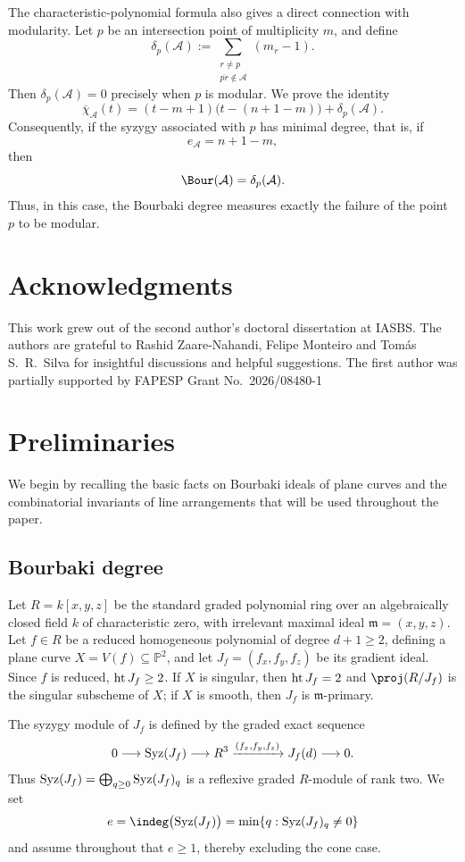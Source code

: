 \documentclass[11pt]{amsart}   %
\theoremstyle{definition}
\def\hht{{\rm ht}\,}
\def\syz{\mbox{\rm Syz}}
\def\hht{{\rm ht}\,}
\def\fm{{\mathfrak m}}
\def\fm{{\mathfrak m}}
\def\NZQ{\mathbb}               %
\def\PP{{\NZQ P}}
\def\A{{\mathcal A}}
\begin{document}
The characteristic-polynomial formula also gives a direct connection
with modularity. Let $p$ be an intersection point of multiplicity
$m$, and define
\[
\delta_p(\A)
:=
\sum_{\substack{r\neq p\\ \overline{pr}\notin\A}}
(m_r-1).
\]
Then $\delta_p(\A)=0$ precisely when $p$ is modular. We prove the
identity
\[
\overline{\chi}_\A(t)
=
(t-m+1)\bigl(t-(n+1-m)\bigr)+\delta_p(\A).
\]
Consequently, if the syzygy associated with $p$ has minimal degree,
that is, if
\[
e_\A=n+1-m,
\]
then
\[
\Bour(\A)=\delta_p(\A).
\]
Thus, in this case, the Bourbaki degree measures exactly the failure
of the point $p$ to be modular.



\section*{Acknowledgments}
This work grew out of the second author's doctoral dissertation at IASBS. The authors are grateful to  Rashid Zaare-Nahandi, Felipe Monteiro and  Tomás S.~R.~Silva for insightful discussions and helpful suggestions. The first author was partially supported by FAPESP Grant No.~2026/08480-1


\section{Preliminaries}
\label{sec:preliminaries}
We begin by recalling the basic facts on Bourbaki ideals of plane curves and the combinatorial invariants of line arrangements that will be used throughout the paper.

\subsection{Bourbaki degree}
Let $R=k[x,y,z]$ be the standard graded polynomial ring over an algebraically closed field $k$ of characteristic zero, with irrelevant maximal ideal $\fm=(x,y,z)$. Let $f\in R$ be a reduced homogeneous polynomial of degree $d+1\geq2$, defining a plane curve $X=V(f)\subseteq\PP^2$, and let $J_f=(f_x,f_y,f_z)$ be its gradient ideal. Since $f$ is reduced, $\hht J_f\geq2$. If $X$ is singular, then $\hht J_f=2$ and $\proj(R/J_f)$ is the singular subscheme of $X$; if $X$ is smooth, then $J_f$ is $\fm$-primary.

The syzygy module of $J_f$ is defined by the graded exact sequence
\[
0\longrightarrow\syz(J_f)\longrightarrow R^3
\xrightarrow{(f_x,f_y,f_z)}J_f(d)\longrightarrow0.
\]
Thus $\syz(J_f)=\bigoplus_{q\geq0}\syz(J_f)_q$ is a reflexive graded $R$-module of rank two. We set
\[
e=\indeg\bigl(\syz(J_f)\bigr)
=\min\{q:\syz(J_f)_q\neq0\}
\]
and assume throughout that $e\geq1$, thereby excluding the cone case.
\end{document}
